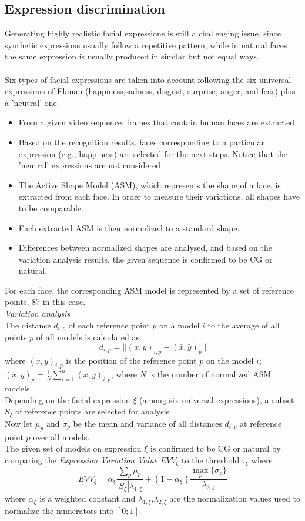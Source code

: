\documentclass[10pt,a4paper]{book}
\begin{document}
\subsection{Expression discrimination}
Generating highly realistic facial expressions is still a challenging issue, since synthetic expressions usually follow a repetitive pattern, while in natural faces the same expression is usually produced in similar but not equal ways.\\\\
Six types of facial expressions are taken into account following the six universal expressions of Ekman (happiness,sadness, disgust, surprise, anger, and fear) plus a 'neutral' one.
\begin{itemize}
\item From a given video sequence, frames that contain human faces are extracted
\item  Based on the recognition results, faces corresponding to a
particular expression (e.g., happiness) are selected for the next
steps. Notice that the 'neutral' expressions are not considered
\item The Active Shape Model (ASM), which represents the shape of a face, is extracted from
each face. In order to measure their variations, all shapes have to be comparable.
\item Each extracted ASM is then normalized to a standard shape.
\item Differences between normalized shapes are analysed, and based on the variation analysis results, the given sequence is confirmed to be CG or natural.
\end{itemize}
For each face, the corresponding ASM model is represented by a set of reference points, 87 in this case.\\
\emph{Variation analysis}\\
The distance $d_{i,p}$ of each reference point $p$ on a model $i$ to the average of all points $p$ of all models is calculated as:
$$ d_{i,p} = || (x,y)_{i,p} - (\bar x, \bar y)_p||$$
where $(x,y)_{i,p}$ is the position of the reference point $p$ on the model $i$;\\
$(\bar x, \bar y)_p = \frac{1}{N} \sum_{i=1}^n (x,y)_{i,p}$, where $N$ is the number of normalized ASM models.\\
Depending on the facial expression $\xi$ (among six universal expressions), a subset $S_{\xi}$ of reference points are selected for analysis.\\
Now let $\mu_p$ and $\sigma_p$ be the mean and variance of all distances $d_{i,p}$ at reference point $p$ over all models.\\
The given set of models on expression $\xi$ is confirmed to be CG or natural by comparing the \textit{Expression Variation Value} $EVV_{\xi}$ to the threshold $\tau_{\xi}$ where
$$ EVV_{\xi} = \alpha_{\xi} \frac{\sum_p \mu_p}{|S_{\xi}| \lambda_{1,\xi}} +  (1-\alpha_{\xi}) \frac{\max_p \{ \sigma_p \}}{\lambda_{2,\xi}}$$
where $\alpha_{\xi}$ is a weighted constant and $\lambda_{1,\xi}$,$ \lambda_{2,\xi}$ are the normalization values used to normalize the numerators into $[0;1]$.
\end{document}
